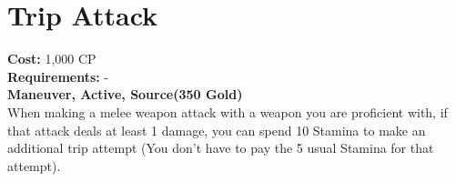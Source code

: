 \section{Trip Attack}\label{maneuver:tripAttack}
\textbf{Cost:} 1,000 CP\\
\textbf{Requirements:} -\\
\textbf{Maneuver, Active, Source(350 Gold)}\\
When making a melee weapon attack with a weapon you are proficient with, if that attack deals at least 1 damage, you can spend 10 Stamina to make an additional trip attempt (You don't have to pay the 5 usual Stamina for that attempt).\\

